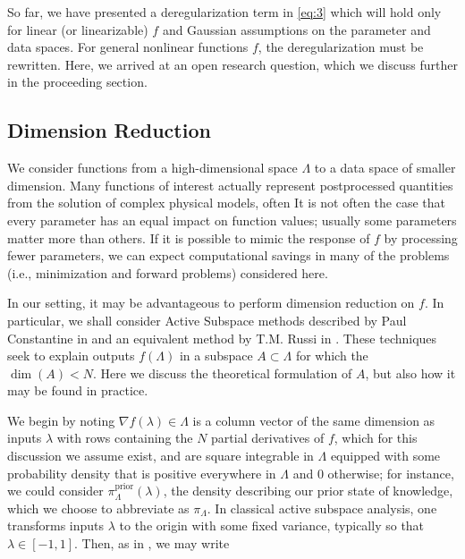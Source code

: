\documentclass{amsart}
\begin{document}
So far, we have presented a deregularization term in \eqref{eq:3} which will hold only for linear (or linearizable) $f$ and Gaussian assumptions on the parameter and data spaces. For general nonlinear functions $f$, the deregularization must be rewritten. Here, we arrived at an open research question, which we discuss further in the proceeding section.



\subsection{Dimension Reduction}
We consider functions from a high-dimensional space $\Lambda$ to a data space of smaller dimension. Many functions of interest %
actually represent postprocessed quantities from the solution of complex physical models, often %
It is not often the case that every parameter has an equal impact on function values; usually some parameters matter more than others. If it is possible to mimic the response of $f$ by processing fewer parameters, we can expect computational savings in many of the problems (i.e., minimization and forward problems) considered here.

In our setting, it may be advantageous to perform dimension reduction on $f$. In particular, we shall consider Active Subspace methods described by Paul Constantine in \cite{Constantine2015} and an equivalent method by T.M. Russi in \cite{Russi}. These techniques seek to explain outputs $f(\Lambda)$ in a subspace $A \subset \Lambda$ for which the $\dim (A) <N$. Here we discuss the theoretical formulation of $A$, but also how it may be found in practice.

We begin by noting $\nabla f(\lambda)\in \Lambda$ is a column vector of the same dimension as inputs $\lambda$ with rows containing the $N$ partial derivatives of $f$, which for this discussion we assume exist, and are square integrable in $\Lambda$ equipped with some probability density that is positive everywhere in $\Lambda$ and 0 otherwise; for instance, we could consider $\pi_\Lambda^\text{prior}(\lambda)$, the density describing our prior state of knowledge, which we choose to abbreviate as $\pi_\Lambda$. %
In classical active subspace analysis, one transforms inputs $\lambda$ to the origin with some fixed variance, typically so that $\lambda\in [-1,1]$. Then, as in \cite{ConstantineMC}, we may write
\end{document}
